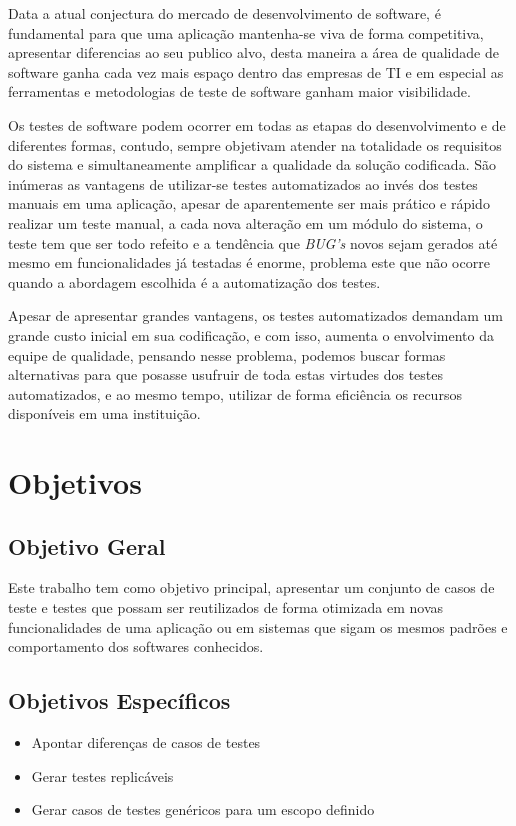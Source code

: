 \documentclass[12pt]{article}
\begin{document}
	Data a atual conjectura do mercado de desenvolvimento de software, é fundamental para
	que uma aplicação mantenha-se viva de forma competitiva, apresentar diferencias ao seu publico alvo, desta maneira a
	área de qualidade de software ganha cada vez mais espaço dentro das empresas de TI e em especial as ferramentas e metodologias
	de teste de software ganham maior visibilidade.
	
	Os testes de software podem ocorrer em todas as etapas do desenvolvimento e de diferentes formas, contudo,
	sempre objetivam atender na totalidade os requisitos do sistema e simultaneamente amplificar a qualidade da solução
	codificada. São inúmeras as vantagens de utilizar-se testes automatizados ao invés dos testes manuais em uma aplicação,
	apesar de aparentemente ser mais prático e rápido realizar um teste manual, a cada nova alteração em um módulo do sistema,
	o teste tem que ser todo refeito e a tendência que \emph{BUG's} novos sejam gerados até mesmo em funcionalidades já testadas é enorme,
	problema este que não ocorre quando a abordagem escolhida é a automatização dos testes.
	
	Apesar de apresentar grandes vantagens, os testes automatizados demandam um grande custo inicial em sua codificação,
	e com isso, aumenta o envolvimento da equipe de qualidade, pensando nesse problema, podemos buscar formas alternativas para
	que posasse usufruir de toda estas virtudes dos testes automatizados, e ao mesmo tempo, utilizar de forma eficiência os
	recursos disponíveis em uma instituição.
	
	\section{Objetivos}
	
	\subsection{Objetivo Geral}
	
	Este trabalho tem como objetivo principal, apresentar um conjunto de casos de teste e testes que possam ser reutilizados de
	forma otimizada em novas funcionalidades de uma aplicação ou em sistemas que sigam os mesmos padrões e comportamento dos
	softwares conhecidos.
	
	\subsection{Objetivos Específicos}
	\begin{itemize}
		\item Apontar diferenças de casos de testes
		\item Gerar testes replicáveis
		\item Gerar casos de testes genéricos para um escopo definido
	\end{itemize}
	
\end{document}
